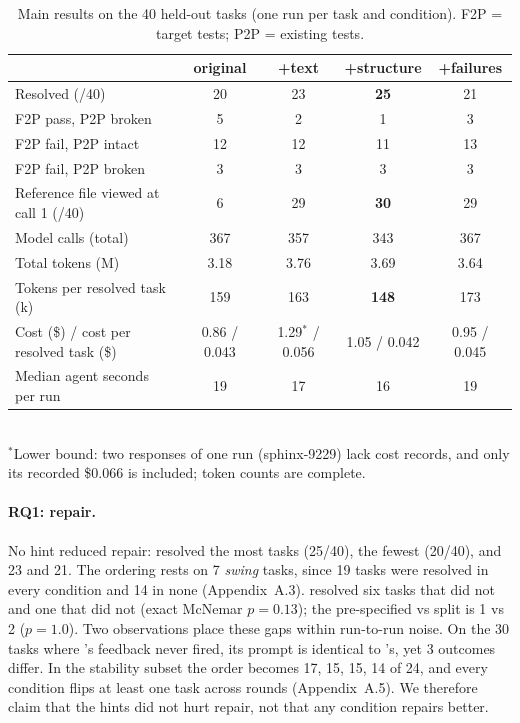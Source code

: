 \begin{table}[h]
\centering\small
\caption{Main results on the 40 held-out tasks (one run per task and condition).
F2P = target tests; P2P = existing tests.}
\label{tab:main}
\begin{tabular}{@{}lcccc@{}}
\toprule
 & \condA{} original & \condB{} +text & \condC{} +structure & \condD{} +failures \\
\midrule
Resolved (/40)                          & 20 & 23 & \textbf{25} & 21 \\
F2P pass, P2P broken                    & 5  & 2  & 1  & 3  \\
F2P fail, P2P intact                    & 12 & 12 & 11 & 13 \\
F2P fail, P2P broken                    & 3  & 3  & 3  & 3  \\
\midrule
Reference file viewed at call 1 (/40)   & 6  & 29 & \textbf{30} & 29 \\
Model calls (total)                     & 367 & 357 & 343 & 367 \\
Total tokens (M)                        & 3.18 & 3.76 & 3.69 & 3.64 \\
Tokens per resolved task (k)            & 159 & 163 & \textbf{148} & 173 \\
Cost (\$) / cost per resolved task (\$) & 0.86 / 0.043 & 1.29$^*$ / 0.056 & 1.05 / 0.042 & 0.95 / 0.045 \\
Median agent seconds per run            & 19 & 17 & 16 & 19 \\
\bottomrule
\end{tabular}\\[2pt]
{\footnotesize $^*$Lower bound: two responses of one \condB{} run (sphinx-9229) lack cost records, and only its recorded \$0.066 is included; token counts are complete.}
\end{table}

\paragraph{RQ1: repair.}
No hint reduced repair: \condC{} resolved the most tasks (25/40), \condA{} the fewest (20/40), \condB{}
and \condD{} 23 and 21. The ordering rests on 7 \emph{swing} tasks, since 19 tasks were resolved in every
condition and 14 in none (Appendix~A.3). \condC{} resolved six tasks that \condA{} did not and \condA{} one
that \condC{} did not (exact McNemar $p=0.13$); the pre-specified \condA{} vs \condD{} split is 1 vs 2
($p=1.0$). Two observations place these gaps within run-to-run noise. On the 30 tasks where \condD's
feedback never fired, its prompt is identical to \condC's, yet 3 outcomes differ. In the stability
subset the order becomes \condD{} 17, \condB{} 15, \condC{} 15, \condA{} 14 of 24, and every condition
flips at least one task across rounds (Appendix~A.5). We therefore claim that the hints did not hurt
repair, not that any condition repairs better.

